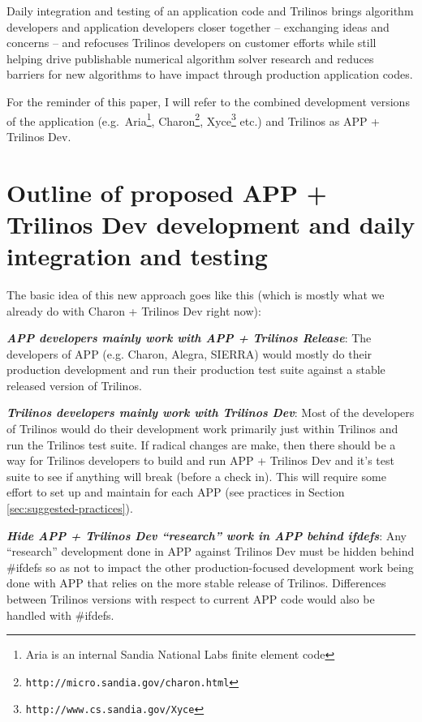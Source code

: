 \documentclass[pdf,ps2pdf,11pt]{SANDreport}
\begin{document}
Daily integration and testing of an application code and Trilinos
brings algorithm developers and application developers closer together --
exchanging ideas and concerns -- and refocuses Trilinos developers on customer 
efforts while still helping drive publishable numerical algorithm solver
research and reduces barriers for new algorithms to have impact through
production application codes.

For the reminder of this paper, I will refer to the combined development
versions of the application (e.g.\ Aria\footnote{Aria is an internal Sandia
National Labs finite element code},
Charon\footnote{\texttt{http://micro.sandia.gov/charon.html}},
Xyce\footnote{\texttt{http://www.cs.sandia.gov/Xyce}} etc.) and Trilinos as
APP + Trilinos Dev.


%
{}\section{Outline of proposed APP + Trilinos Dev development and daily
integration and testing}
%

The basic idea of this new approach goes like this (which is mostly what we
already do with Charon + Trilinos Dev right now):

{}\textit{\textbf{APP developers mainly work with APP + Trilinos Release}}:
The developers of APP (e.g. Charon, Alegra, SIERRA) would mostly do their
production development and run their production test suite against a stable
released version of Trilinos.

{}\textit{\textbf{Trilinos developers mainly work with Trilinos Dev}}: Most of
the developers of Trilinos would do their development work primarily just within
Trilinos and run the Trilinos test suite.  If radical changes are make, then
there should be a way for Trilinos developers to build and run APP + Trilinos
Dev and it's test suite to see if anything will break (before a check in).
This will require some effort to set up and maintain for each APP (see
practices in Section {}\ref{sec:suggested-practices}).

{}\textit{\textbf{Hide APP + Trilinos Dev ``research'' work in APP behind
ifdefs}}: Any ``research'' development done in APP against Trilinos Dev must
be hidden behind {}\#ifdefs so as not to impact the other production-focused
development work being done with APP that relies on the more stable release of
Trilinos.  Differences between Trilinos versions with respect to current APP
code would also be handled with {}\#ifdefs.
\end{document}

